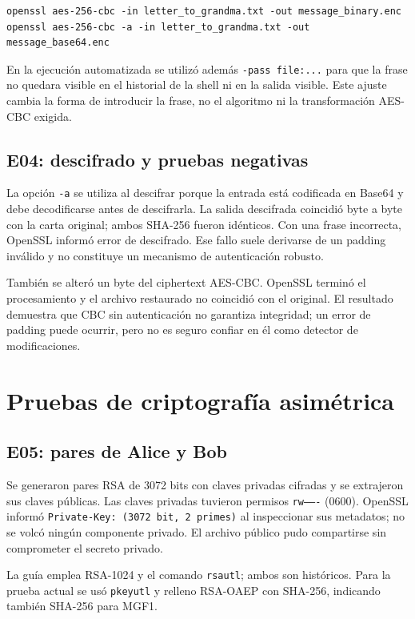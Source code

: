 \documentclass[11pt,a4paper]{article}
\begin{document}
\begin{verbatim}
openssl aes-256-cbc -in letter_to_grandma.txt -out message_binary.enc
openssl aes-256-cbc -a -in letter_to_grandma.txt -out message_base64.enc
\end{verbatim}

En la ejecución automatizada se utilizó además \texttt{-pass file:...} para
que la frase no quedara visible en el historial de la shell ni en la salida
visible. Este ajuste cambia la forma de introducir la frase, no el algoritmo
ni la transformación AES-CBC exigida.

\subsection{E04: descifrado y pruebas negativas}
La opción \texttt{-a} se utiliza al descifrar porque la entrada está codificada
en Base64 y debe decodificarse antes de descifrarla. La salida descifrada
coincidió byte a byte con la carta original; ambos SHA-256 fueron idénticos.
Con una frase incorrecta, OpenSSL informó error de descifrado. Ese fallo suele
derivarse de un padding inválido y no constituye un mecanismo de autenticación
robusto.

También se alteró un byte del ciphertext AES-CBC. OpenSSL terminó el
procesamiento y el archivo restaurado no coincidió con el original. El
resultado demuestra que CBC sin autenticación no garantiza integridad; un
error de padding puede ocurrir, pero no es seguro confiar en él como detector
de modificaciones.

\section{Pruebas de criptografía asimétrica}
\subsection{E05: pares de Alice y Bob}
Se generaron pares RSA de 3072 bits con claves privadas cifradas y se
extrajeron sus claves públicas. Las claves privadas tuvieron permisos
\texttt{rw-------} (0600). OpenSSL informó \texttt{Private-Key: (3072 bit,
2 primes)} al inspeccionar sus metadatos; no se volcó ningún componente
privado. El archivo público pudo compartirse sin comprometer el secreto
privado.

La guía emplea RSA-1024 y el comando \texttt{rsautl}; ambos son históricos.
Para la prueba actual se usó \texttt{pkeyutl} y relleno RSA-OAEP con SHA-256,
indicando también SHA-256 para MGF1.
\end{document}
